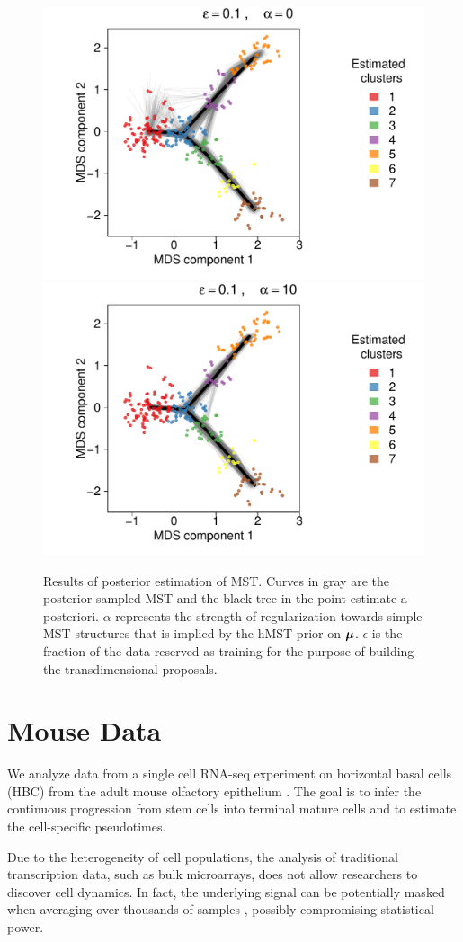 \begin{figure}[!ht]
  \centering
  \includegraphics[width=.48\linewidth]{Img/Sim_slingshot/estimated_trees_slingshot_eps_01_xi_0.pdf}
  \includegraphics[width=.48\linewidth]{Img/Sim_slingshot/estimated_trees_slingshot_eps_01_xi_10.pdf}
\caption{Results of posterior estimation of MST. Curves in gray are the posterior sampled MST and the black tree in the point estimate a posteriori. $\alpha$ represents the strength of regularization towards simple MST structures that is implied by the hMST prior on $\mbox{\boldmath $\mu$}$. $\epsilon$ is the fraction of the data reserved as training for the purpose of building the transdimensional proposals.}
\label{fig:sim2_hmst}
\end{figure}



\section{Mouse Data}

We  analyze data from 
a single cell RNA-seq experiment on horizontal basal cells (HBC) from the adult mouse
olfactory epithelium \citep{street2018}.
The goal is to infer the continuous progression from stem cells into
terminal mature cells and to estimate the cell-specific pseudotimes.

Due to the heterogeneity of cell populations, the analysis of
traditional transcription data, such as bulk microarrays, does not
allow researchers to discover cell dynamics. In fact, the underlying
signal can be potentially masked when averaging over thousands of
samples \citep{korthauer2016statistical},  possibly compromising
statistical power. 

